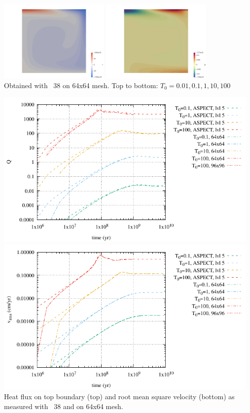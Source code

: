 \begin{center}
\includegraphics[height=4cm]{python_codes/fieldstone_38/results/T0_100_64x64/T}
\includegraphics[height=4cm]{python_codes/fieldstone_38/results/T0_100_64x64/qy}\\
{\captionfont Obtained with \stone~38 on 64x64 mesh. 
Top to bottom: $T_0=0.01,0.1,1,10,100$}
\end{center}

\newpage
\begin{center}
\includegraphics[width=13cm]{python_codes/fieldstone_38/results/Q.pdf}\\
\includegraphics[width=13cm]{python_codes/fieldstone_38/results/vrms.pdf}\\
{\captionfont Heat flux on top boundary (top) and root mean square velocity (bottom)
as measured with \stone~38 and \aspect on 64x64 mesh.}
\end{center}






